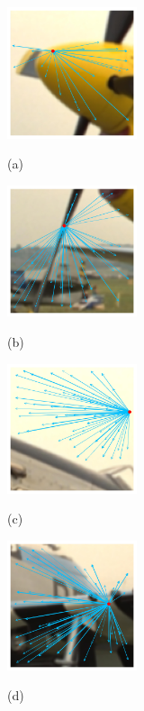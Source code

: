 	\begin{figure}[]
		\centering
		\begin{minipage}[t]{.24\linewidth}
			\includegraphics[width=1.5in]{cropped/jet_superpixel_4.jpg}
			\centerline{(a)}
			\label{JET-1}
		\end{minipage}
		\begin{minipage}[t]{.24\linewidth}
			\includegraphics[width=1.5in]{cropped/jet_superpixel_8.jpg}
			\centerline{(b)}
			\label{JET-2}
		\end{minipage}
		\begin{minipage}[t]{.24\linewidth}
			\includegraphics[width=1.5in]{cropped/jet_superpixel_6.jpg}
			\centerline{(c)}
			\label{JET-3}
		\end{minipage}
		\begin{minipage}[t]{.24\linewidth}
			\includegraphics[width=1.5in]{cropped/jet_superpixel_11.jpg}
			\centerline{(d)}
			\label{JET-4}
		\end{minipage}

\end{figure}
